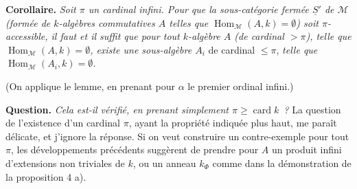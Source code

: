 \documentclass[11pt]{article}
\newcommand{\printedpage}[1]{\marginpar{\footnotesize p.~#1}}
\newcommand{\Hom}{\operatorname{Hom}}
\newcommand{\card}{\operatorname{card}}
\begin{document}
\printedpage{199}

\noindent\textbf{Corollaire.} \textit{Soit $\pi$ un cardinal infini. Pour que la sous-catégorie fermée $\underline{S}'$ de $\mathcal{M}$ (formée de $k$-algèbres commutatives $A$ telles que $\Hom_{\mathcal{M}}(A,k)=\emptyset$) soit $\pi$-accessible, il faut et il suffit que pour tout $k$-algèbre $A$ (de cardinal ${}>\pi$), telle que $\Hom_{\mathcal{M}}(A,k)=\emptyset$, existe une sous-algèbre $A_i$} de cardinal $\leqslant\pi$, \textit{telle que $\Hom_{\mathcal{M}}(A_i,k)=\emptyset$.} %

\noindent(On applique le lemme, en prenant pour $\alpha$ le premier ordinal infini.)

\noindent\textbf{Question.} \textit{Cela est-il vérifié, en prenant simplement $\pi\geqslant\card k$~?} La question de l'existence d'un cardinal $\pi$, ayant la propriété indiquée plus haut, me paraît délicate, et j'ignore la réponse. Si on veut construire un contre-exemple pour tout $\pi$, les développements précédents suggèrent de prendre pour $A$ un produit infini d'extensions non triviales de $k$, ou un anneau $k_{\Phi}$ comme dans la démonstration de la proposition 4 a).
\end{document}

